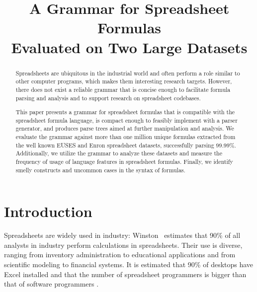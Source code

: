 \documentclass[conference]{IEEEtran}
\begin{document}
\title{A Grammar for Spreadsheet Formulas\\Evaluated on Two Large Datasets}

\author{
}
\maketitle

\begin{abstract}
Spreadsheets are ubiquitous in the industrial world and often perform a role similar to other computer programs, which makes them interesting research targets.
However, there does not exist a reliable grammar that is concise enough to facilitate formula parsing and analysis and to support research on spreadsheet codebases.

This paper presents a grammar for spreadsheet formulas that is compatible with the spreadsheet formula language, is compact enough to feasibly implement with a parser generator, and produces parse trees aimed at further manipulation and analysis. 
We evaluate the grammar against more than one million unique formulas extracted from the well known EUSES and Enron spreadsheet datasets, successfully parsing 99.99\%.
Additionally, we utilize the grammar to analyze these datasets and measure the frequency of usage of language features in spreadsheet formulas.
Finally, we identify smelly constructs and uncommon cases in the syntax of formulas.
\end{abstract}

\IEEEpeerreviewmaketitle

\vspace{0.5em}

\section{Introduction}
Spreadsheets are widely used in industry: Winston~\cite{Wins2001} estimates that 90\% of all analysts in industry perform calculations in
spreadsheets. Their use is diverse, ranging from inventory administration to educational applications and from scientific
modeling to financial systems. It is estimated that 90\% of desktops have Excel installed \cite{DBLP:conf/icse/BradleyM09} and that the number of spreadsheet programmers is bigger than that of software programmers \cite{DBLP:conf/vl/ScaffidiSM05}. 
\end{document}
